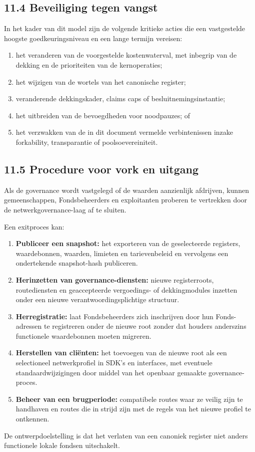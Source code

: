 \documentclass[11pt]{article}
\begin{document}
\subsection*{11.4 Beveiliging tegen vangst}

In het kader van dit model zijn de volgende kritieke acties die een vastgestelde hoogste goedkeuringsniveau en een lange termijn vereisen:

\begin{enumerate}[leftmargin=*]
\item het veranderen van de voorgestelde kostenwaterval, met inbegrip van de dekking en de prioriteiten van de kernoperaties;
\item het wijzigen van de wortels van het canonische register;
\item veranderende dekkingskader, claims caps of besluitnemingsinstantie;
\item het uitbreiden van de bevoegdheden voor noodpauzes; of
\item het verzwakken van de in dit document vermelde verbintenissen inzake forkability, transparantie of poolsoevereiniteit.
\end{enumerate}
\subsection*{11.5 Procedure voor vork en uitgang}

Als de governance wordt vastgelegd of de waarden aanzienlijk afdrijven, kunnen gemeenschappen, Fondsbeheerders en exploitanten proberen te vertrekken door de netwerkgovernance-laag af te sluiten.

Een exitproces kan:

\begin{enumerate}[leftmargin=*]
\item \textbf{Publiceer een snapshot:} het exporteren van de geselecteerde registers, waardebonnen, waarden, limieten en tarievenbeleid en vervolgens een ondertekende snapshot-hash publiceren.
\item \textbf{Herinzetten van governance-diensten:} nieuwe registerroots, routediensten en geaccepteerde vergoedings- of dekkingmodules inzetten onder een nieuwe verantwoordingsplichtige structuur.
\item \textbf{Herregistratie:} laat Fondsbeheerders zich inschrijven door hun Fonds-adressen te registreren onder de nieuwe root zonder dat houders anderszins functionele waardebonnen moeten migreren.
\item \textbf{Herstellen van cliënten:} het toevoegen van de nieuwe root als een selectioneel netwerkprofiel in SDK's en interfaces, met eventuele standaardwijzigingen door middel van het openbaar gemaakte governance-proces.
\item \textbf{Beheer van een brugperiode:} compatibele routes waar ze veilig zijn te handhaven en routes die in strijd zijn met de regels van het nieuwe profiel te ontkennen.
\end{enumerate}
De ontwerpdoelstelling is dat het verlaten van een canoniek register niet anders functionele lokale fondsen uitschakelt.
\end{document}
